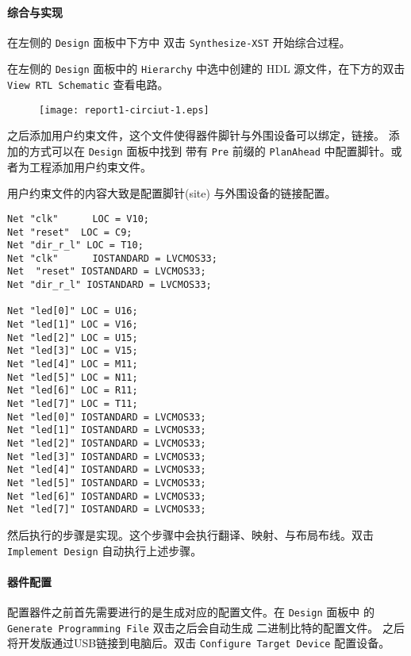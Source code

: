 \documentclass{ctexart}
\begin{document}
        \paragraph{综合与实现}

		在左侧的 \verb|Design| 面板中下方中 双击 \verb|Synthesize-XST| 开始综合过程。
		

        在左侧的 \verb|Design| 面板中的 \verb|Hierarchy| 中选中创建的 HDL 源文件，在下方的双击 \verb|View RTL Schematic| 查看电路。

        \begin{figure}
\centering
\texttt{[image: report1-circiut-1.eps]}
\caption[Circuit]{}
\label{fig:report1-circiut-1}
\end{figure}

        之后添加用户约束文件，这个文件使得器件脚针与外围设备可以绑定，链接。
        添加的方式可以在 \verb|Design| 面板中找到 带有 \verb|Pre| 前缀的 \verb|PlanAhead| 中配置脚针。或者为工程添加用户约束文件。
		
        用户约束文件的内容大致是配置脚针(site) 与外围设备的链接配置。
\begin{lstlisting}
Net "clk"      LOC = V10;
Net "reset"  LOC = C9;
Net "dir_r_l" LOC = T10;
Net "clk"      IOSTANDARD = LVCMOS33;
Net  "reset" IOSTANDARD = LVCMOS33;
Net "dir_r_l" IOSTANDARD = LVCMOS33;

Net "led[0]" LOC = U16;
Net "led[1]" LOC = V16;
Net "led[2]" LOC = U15;
Net "led[3]" LOC = V15;
Net "led[4]" LOC = M11;
Net "led[5]" LOC = N11;
Net "led[6]" LOC = R11;
Net "led[7]" LOC = T11;
Net "led[0]" IOSTANDARD = LVCMOS33;
Net "led[1]" IOSTANDARD = LVCMOS33;
Net "led[2]" IOSTANDARD = LVCMOS33;
Net "led[3]" IOSTANDARD = LVCMOS33;
Net "led[4]" IOSTANDARD = LVCMOS33;
Net "led[5]" IOSTANDARD = LVCMOS33;
Net "led[6]" IOSTANDARD = LVCMOS33;
Net "led[7]" IOSTANDARD = LVCMOS33;
\end{lstlisting}
		
        然后执行的步骤是实现。这个步骤中会执行翻译、映射、与布局布线。双击
        \verb|Implement Design| 自动执行上述步骤。
		
        \paragraph{器件配置}

        配置器件之前首先需要进行的是生成对应的配置文件。在 \verb|Design| 面板中
        的 \verb|Generate Programming File|  双击之后会自动生成 二进制比特的配置文件。
        之后将开发版通过USB链接到电脑后。双击 \verb|Configure Target Device| 配置设备。

        
\end{document}
